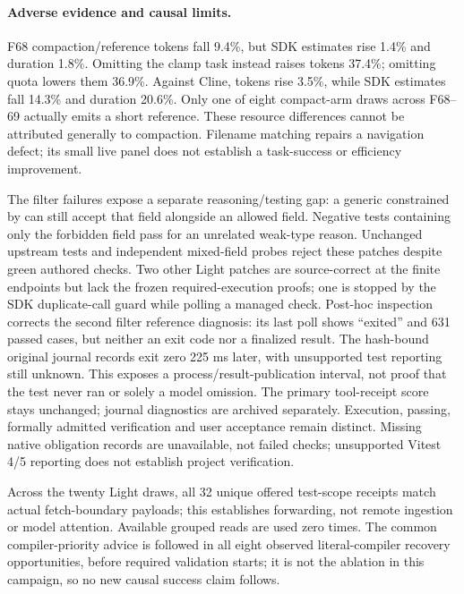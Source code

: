 \documentclass[11pt,a4paper]{article}
\newcommand{\code}[1]{\texttt{\detokenize{#1}}}
\begin{document}
\paragraph{Adverse evidence and causal limits.}
F68 compaction/reference tokens fall 9.4\%, but SDK estimates rise 1.4\% and
duration 1.8\%. Omitting the clamp task instead raises tokens 37.4\%; omitting
quota lowers them 36.9\%. Against Cline, tokens rise 3.5\%, while SDK estimates
fall 14.3\% and duration 20.6\%. Only one of eight compact-arm draws across
F68--69 actually emits a short reference. These resource differences cannot be
attributed generally to compaction. Filename matching repairs a navigation defect;
its small live panel does not establish a task-success or efficiency improvement.

The filter failures expose a separate reasoning/testing gap: a generic constrained
by \code{Omit<...,'fetchStatus'>} can still accept that field alongside an allowed
field. Negative tests containing only the forbidden field pass for an unrelated
weak-type reason. Unchanged upstream tests and independent mixed-field probes
reject these patches despite green authored checks. Two other Light patches are
source-correct at the finite endpoints but lack the frozen required-execution
proofs; one is stopped by the SDK duplicate-call guard while polling a managed
check. Post-hoc inspection corrects the
second filter reference diagnosis: its last poll shows ``exited'' and 631 passed
cases, but neither an exit code nor a finalized result. The hash-bound original
journal records exit zero 225 ms later, with unsupported test reporting still
unknown. This exposes a process/result-publication interval, not proof that the
test never ran or solely a model omission. The primary tool-receipt score stays
unchanged; journal diagnostics are archived separately. Execution, passing,
formally admitted verification and user acceptance remain distinct. Missing native
obligation records are unavailable, not failed checks; unsupported Vitest 4/5
reporting does not establish project verification.

Across the twenty Light draws, all 32 unique offered test-scope receipts match
actual fetch-boundary payloads; this establishes forwarding, not remote ingestion
or model attention. Available grouped reads are used zero times. The common
compiler-priority advice is followed in all eight observed literal-compiler
recovery opportunities, before required validation starts; it is not the
ablation in this campaign, so no new causal success claim follows.
\end{document}
